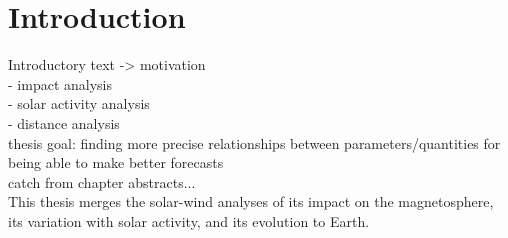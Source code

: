 
\chapter{Introduction}
\label{chap:introduction}


Introductory text -> motivation\\
- \Kp{} impact analysis\\
- solar activity analysis\\
- distance analysis\\



thesis goal: finding more precise relationships between parameters/quantities for being able to make better forecasts\\

catch from chapter abstracts...\\

This thesis merges the solar-wind analyses of its impact on the magnetosphere, its variation with solar activity, and its evolution to Earth.\\

